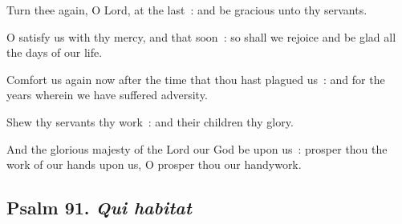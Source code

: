 Turn thee again, O Lord, at the last~: and be gracious unto thy servants.\par
{}O satisfy us with thy mercy, and that soon~: so shall we rejoice and be glad all the days of our life.\par
{}Comfort us again now after the time that thou hast plagued us~: and for the years wherein we have suffered adversity.\par
{}Shew thy servants thy work~: and their children thy glory.\par
{}And the glorious majesty of the Lord our God be upon us~: prosper thou the work of our hands upon us, O prosper thou our handywork.\par


\clearpage
\subsection{Psalm 91. \textit{Qui habitat}}


